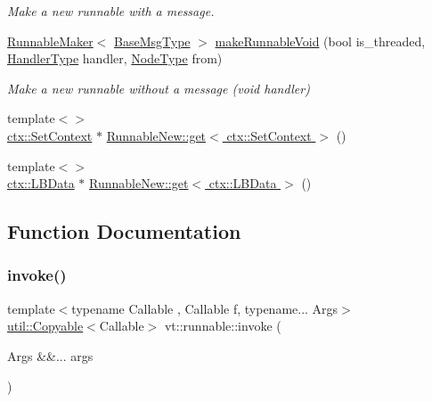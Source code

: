 \begin{DoxyCompactItemize}
\begin{DoxyCompactList}\small\item\em Make a new runnable with a message. \end{DoxyCompactList}\item 
\hyperlink{structvt_1_1runnable_1_1_runnable_maker}{Runnable\+Maker}$<$ \hyperlink{namespacevt_a44d0d4e144748f2b19a1cfd962f50338}{Base\+Msg\+Type} $>$ \hyperlink{namespacevt_1_1runnable_aa35ee520f896c49ba7f3952acb5881b2}{make\+Runnable\+Void} (bool is\+\_\+threaded, \hyperlink{namespacevt_af64846b57dfcaf104da3ef6967917573}{Handler\+Type} handler, \hyperlink{namespacevt_a866da9d0efc19c0a1ce79e9e492f47e2}{Node\+Type} from)
\begin{DoxyCompactList}\small\item\em Make a new runnable without a message (void handler) \end{DoxyCompactList}\item 
{\footnotesize template$<$$>$ }\\\hyperlink{structvt_1_1ctx_1_1_set_context}{ctx\+::\+Set\+Context} $\ast$ \hyperlink{namespacevt_1_1runnable_afec92e402b96766d18a24246651015f3}{Runnable\+New\+::get$<$ ctx\+::\+Set\+Context $>$} ()
\item 
{\footnotesize template$<$$>$ }\\\hyperlink{structvt_1_1ctx_1_1_l_b_data}{ctx\+::\+L\+B\+Data} $\ast$ \hyperlink{namespacevt_1_1runnable_ace1b6a23d611fae4fa00910100d91702}{Runnable\+New\+::get$<$ ctx\+::\+L\+B\+Data $>$} ()
\end{DoxyCompactItemize}


\subsection{Function Documentation}
\mbox{\label{namespacevt_1_1runnable_a14fa3dbf3bef4a683fc7284452b766d3}} 
\subsubsection{\texorpdfstring{invoke()}{invoke()}\hspace{0.1cm}{\footnotesize\ttfamily [1/3]}}
{\footnotesize\ttfamily template$<$typename Callable , Callable f, typename... Args$>$ \\
\hyperlink{namespacevt_1_1util_ae9a553985cdc8e9bd4e55f55161f2929}{util\+::\+Copyable}$<$Callable$>$ vt\+::runnable\+::invoke (\begin{DoxyParamCaption}\item[{Args \&\&...}]{args }\end{DoxyParamCaption})}

